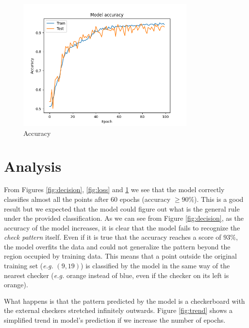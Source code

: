 \documentclass[compsoc]{IEEEtran}
\begin{document}
\begin{figure}[ht!]
\centering                                                                        
\includegraphics[width=3.5in]{../images/accuracy-4000-6-binary_crossentropy-adam-100-4.png}
\captionsetup{justification=centering}                                                                                                                                   
\caption{Accuracy}
\label{fig:acc}                                                                                                                                                           
\end{figure}



\section{Analysis}
From Figures \ref{fig:decision}, \ref{fig:loss} and \ref{fig:acc} we see that the model correctly classifies almost all the points after 60 epochs (accuracy $\geq 90\%$). This is a good result but we expected that the model could figure out what is the general rule under the provided classification.  
As we can see from Figure \ref{fig:decision}, as the accuracy of the model increases, it is clear that the model fails to recognize the \emph{check pattern} itself. Even if it is true that the accuracy reaches a score of $93\%$, the model overfits the data and could not generalize the pattern beyond the region occupied by training data. 
This means that a point outside the original training set (\emph{e.g.} $(9, 19)$) is classified by the model in the same way of the nearest checker (\emph{e.g.} orange instead of blue, even if the checker on its left is orange). \par
What happens is that the pattern predicted by the model is a checkerboard with the external checkers stretched infinitely outwards.
Figure \ref{fig:trend} shows a simplified trend in model's prediction if we increase the number of epochs.
\end{document}
